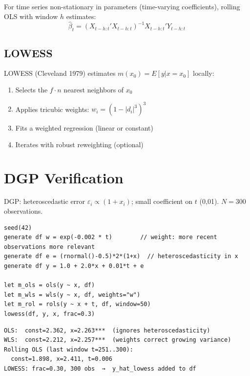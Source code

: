 For time series non-stationary in parameters (time-varying coefficients),
rolling OLS with window $h$ estimates:
\[
  \hat{\beta}_t = (X_{t-h:t}' X_{t-h:t})^{-1} X_{t-h:t}' Y_{t-h:t}
\]

\subsection*{LOWESS}

LOWESS (Cleveland 1979) estimates $m(x_0) = E[y | x = x_0]$ locally:
\begin{enumerate}
  \item Selects the $f \cdot n$ nearest neighbors of $x_0$
  \item Applies tricubic weights: $w_i = (1 - |d_i|^3)^3$
  \item Fits a weighted regression (linear or constant)
  \item Iterates with robust reweighting (optional)
\end{enumerate}

\section{DGP Verification}

DGP: heteroscedastic error $\varepsilon_i \propto (1 + x_i)$; small
coefficient on $t$ (0{,}01). $N = 300$ observations.

\begin{lstlisting}[caption={WLS, Rolling OLS, LOWESS}]
seed(42)
generate df w = exp(-0.002 * t)        // weight: more recent observations more relevant
generate df e = (rnormal()-0.5)*2*(1+x)  // heteroscedasticity in x
generate df y = 1.0 + 2.0*x + 0.01*t + e

let m_ols = ols(y ~ x, df)
let m_wls = wls(y ~ x, df, weights="w")
let m_rol = rols(y ~ x + t, df, window=50)
lowess(df, y, x, frac=0.3)
\end{lstlisting}

\begin{lstlisting}[language={}, basicstyle=\ttfamily\small, frame=none,
  numbers=none, backgroundcolor=\color{codbg}]
OLS:  const=2.362, x=2.263***  (ignores heteroscedasticity)
WLS:  const=2.212, x=2.257***  (weights correct growing variance)
Rolling OLS (last window t=251..300):
  const=1.898, x=2.411, t=0.006
LOWESS: frac=0.30, 300 obs  →  y_hat_lowess added to df
\end{lstlisting}

